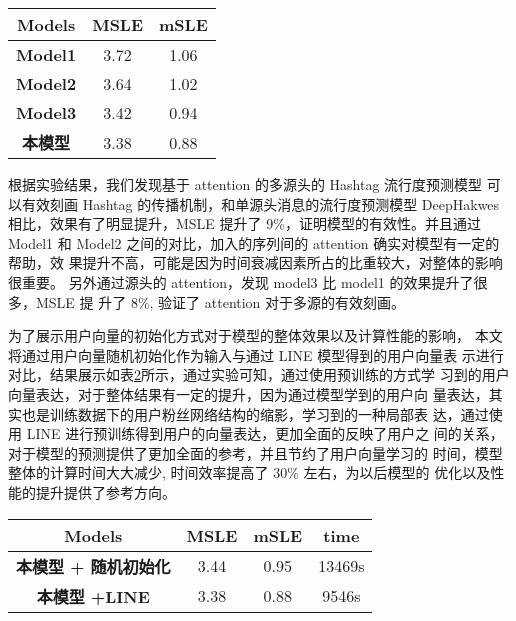 \begin{table}[H]
    \centering
    \footnotesize%
      \label{tab:model_r}
    \setlength{\tabcolsep}{30pt}%
    \renewcommand{\arraystretch}{1.2}%
    \begin{tabular}{ccc}
        \hline
        \textbf{Models }& \textbf{MSLE }&\textbf{ mSLE} \\
        \hline
	    \textbf{Model1} & 3.72 & 1.06\\
	    	    \textbf{Model2} & 3.64 & 1.02\\
	     \textbf{Model3} & 3.42 & 0.94\\
        \textbf{本模型} & 3.38 & 0.88\\
        	\hline
    \end{tabular}

\end{table}


根据实验结果，我们发现基于 attention 的多源头的 Hashtag 流行度预测模型 可以有效刻画 Hashtag 的传播机制，和单源头消息的流行度预测模型 DeepHakwes 相比，效果有了明显提升，MSLE 提升了 9\%，证明模型的有效性。并且通过 Model1 和 Model2 之间的对比，加入的序列间的 attention 确实对模型有一定的帮助，效 果提升不高，可能是因为时间衰减因素所占的比重较大，对整体的影响很重要。 另外通过源头的 attention，发现 model3 比 model1 的效果提升了很多，MSLE 提 升了 8\%, 验证了 attention 对于多源的有效刻画。

为了展示用户向量的初始化方式对于模型的整体效果以及计算性能的影响， 本文将通过用户向量随机初始化作为输入与通过 LINE 模型得到的用户向量表 示进行对比，结果展示如表\ref{tab:model_user}所示，通过实验可知，通过使用预训练的方式学 习到的用户向量表达，对于整体结果有一定的提升，因为通过模型学到的用户向 量表达，其实也是训练数据下的用户粉丝网络结构的缩影，学习到的一种局部表 达，通过使用 LINE 进行预训练得到用户的向量表达，更加全面的反映了用户之 间的关系，对于模型的预测提供了更加全面的参考，并且节约了用户向量学习的 时间，模型整体的计算时间大大减少, 时间效率提高了 30\% 左右，为以后模型的 优化以及性能的提升提供了参考方向。

\begin{table}[H]
    \centering
    \footnotesize%
      \label{tab:model_user}
    \setlength{\tabcolsep}{30pt}%
    \renewcommand{\arraystretch}{1.2}%
    \begin{tabular}{cccc}
        \hline
        \textbf{Models }& \textbf{MSLE }&\textbf{ mSLE} & \textbf{time}\\
        \hline
	    \textbf{本模型 + 随机初始化} & 3.44 & 0.95 & 13469s\\
        \textbf{本模型 +LINE} & 3.38 & 0.88 & 9546s\\
        	\hline
    \end{tabular}

\end{table}


